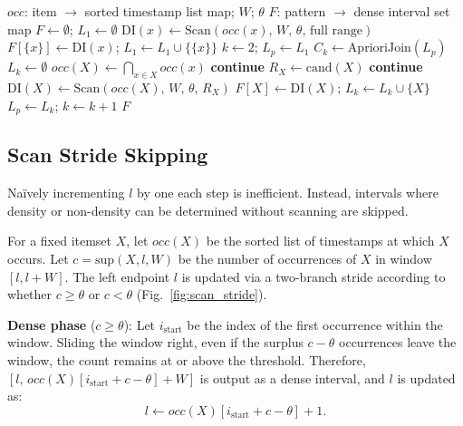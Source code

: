 \begin{algorithm}[t]
\caption{Apriori-Window (single scan)}\label{alg:aw}
\begin{algorithmic}[1]
\Require $\mathit{occ}$: item $\to$ sorted timestamp list map; $W$; $\theta$
\Ensure $F$: pattern $\to$ dense interval set map
\State $F \leftarrow \emptyset$; $L_1 \leftarrow \emptyset$
  \State $\mathrm{DI}(x) \leftarrow \mathrm{Scan}(\mathit{occ}(x),\, W,\, \theta,\, \text{full range})$
    \State $F[\{x\}] \leftarrow \mathrm{DI}(x)$; $L_1 \leftarrow L_1 \cup \{\{x\}\}$
  \EndIf
\EndFor
\State $k \leftarrow 2$; $L_p \leftarrow L_1$
  \State $C_k \leftarrow \mathrm{AprioriJoin}(L_p)$
  \State $L_k \leftarrow \emptyset$
    \State $\mathit{occ}(X) \leftarrow \bigcap_{x \in X} \mathit{occ}(x)$
     \textbf{continue} \EndIf
    \State $R_X \leftarrow \mathrm{cand}(X)$
     \textbf{continue} \EndIf
    \State $\mathrm{DI}(X) \leftarrow \mathrm{Scan}(\mathit{occ}(X),\, W,\, \theta,\, R_X)$
      \State $F[X] \leftarrow \mathrm{DI}(X)$; $L_k \leftarrow L_k \cup \{X\}$
    \EndIf
  \EndFor
  \State $L_p \leftarrow L_k$; $k \leftarrow k + 1$
\EndWhile
\State \Return $F$
\end{algorithmic}
\end{algorithm}

\subsection{Scan Stride Skipping}

Na\"ively incrementing $l$ by one each step is inefficient.
Instead, intervals where density or non-density can be determined
without scanning are skipped.

For a fixed itemset $X$, let $\mathit{occ}(X)$ be the sorted list of
timestamps at which $X$ occurs.
Let $c = \mathrm{sup}(X, l, W)$ be the number of occurrences of $X$
in window $[l, l{+}W]$.
The left endpoint $l$ is updated via a two-branch stride according
to whether $c \geq \theta$ or $c < \theta$ (Fig.~\ref{fig:scan_stride}).

\textbf{Dense phase} ($c \geq \theta$):
Let $i_{\mathrm{start}}$ be the index of the first occurrence within the window.
Sliding the window right, even if the surplus $c - \theta$ occurrences
leave the window, the count remains at or above the threshold.
Therefore, $[l,\, \mathit{occ}(X)[i_{\mathrm{start}} + c - \theta] + W]$ is
output as a dense interval, and $l$ is updated as:
\begin{equation}\label{eq:stride_dense}
  l \leftarrow \mathit{occ}(X)[i_{\mathrm{start}} + c - \theta] + 1.
\end{equation}


